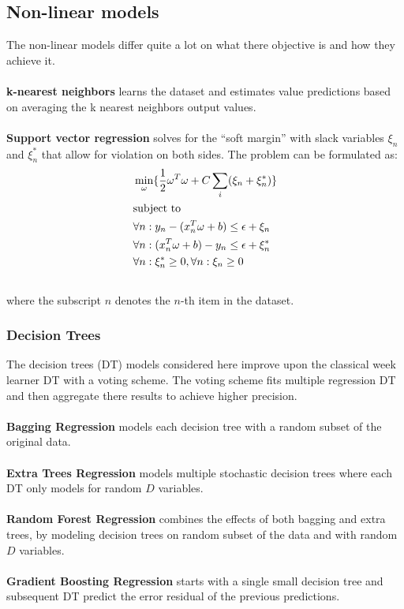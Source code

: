 \documentclass[a4paper]{article}
\begin{document}
\subsection{Non-linear models}
The non-linear models differ quite a lot on what there objective is and how they achieve it. \\\\
\textbf{k-nearest neighbors} learns the dataset and estimates value predictions based on averaging the k nearest neighbors output values. \\\\
\textbf{Support vector regression} solves for the “soft margin” with slack variables $\xi_n$ and $\xi_n^*$ that allow for violation on both sides. The problem can be formulated as:
\begin{align} \label{eq:5}
    &\min_{\omega} \{\frac{1}{2}\omega^T\omega + C\sum_i(\xi_n + \xi_n^*)\} \notag \\
&\text{subject to} \notag \\
    & \forall n : y_n - (x_n^T\omega + b) \leq \epsilon + \xi_n \notag \\
    & \forall n : (x_n^T\omega + b) - y_n\leq \epsilon + \xi_n^* \notag \\
    & \forall n : \xi_n^* \geq 0, \forall n : \xi_n \geq 0 \notag \\ \notag
\end{align} %
where the subscript $n$ denotes the $n$-th item in the dataset.
\subsubsection{Decision Trees}
The decision trees (DT) models considered here improve upon the classical week learner DT with a voting scheme. The voting scheme fits multiple regression DT and then aggregate there results to achieve higher precision. \\\\
\textbf{Bagging Regression} models each decision tree with a random subset of the original data. \\\\
\textbf{Extra Trees Regression} models multiple stochastic decision trees where each DT only models for random $D$ variables. \\\\ %
\textbf{Random Forest Regression} combines the effects of both bagging and extra trees, by modeling decision trees on random subset of the data and with random $D$ variables. \\\\
\textbf{Gradient Boosting Regression} starts with a single small decision tree and subsequent DT predict the error residual of the previous predictions.
\end{document}
